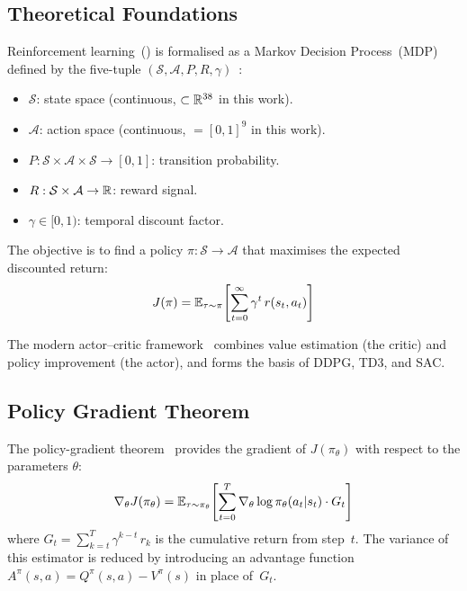\subsection{Theoretical Foundations}
\label{sec:rl_foundations}

Reinforcement learning~(\RL{}) is formalised as a Markov Decision
Process~(MDP) defined by the five-tuple
$(\mathcal{S}, \mathcal{A}, P, R, \gamma)$~\parencite{Bellman1957, Sutton2018}:
\begin{itemize}
  \item $\mathcal{S}$: state space (continuous, $\subset \mathbb{R}^{38}$ in this work).
  \item $\mathcal{A}$: action space (continuous, $= [0,1]^9$ in this work).
  \item $P : \mathcal{S} \times \mathcal{A} \times \mathcal{S} \to [0,1]$:
        transition probability.
  \item $R : \mathcal{S} \times \mathcal{A} \to \mathbb{R}$: reward signal.
  \item $\gamma \in [0,1)$: temporal discount factor.
\end{itemize}

The objective is to find a policy
$\pi : \mathcal{S} \to \mathcal{A}$ that maximises the expected discounted return:
\begin{equation}
  J(\pi) = \mathbb{E}_{\tau \sim \pi}\!\left[\sum_{t=0}^{\infty} \gamma^t\,r(s_t, a_t)\right]
  \label{eq:rl_objective}
\end{equation}

The modern actor--critic framework~\parencite{Konda2000} combines value estimation
(the critic) and policy improvement (the actor), and forms the basis of DDPG, TD3,
and SAC.

\subsection{Policy Gradient Theorem}

The policy-gradient theorem~\parencite{Sutton2018} provides the gradient of
$J(\pi_\theta)$ with respect to the parameters $\theta$:
\begin{equation}
  \nabla_\theta J(\pi_\theta) = \mathbb{E}_{\tau \sim \pi_\theta}\!\left[
    \sum_{t=0}^{T} \nabla_\theta \log \pi_\theta(a_t|s_t) \cdot G_t
  \right]
  \label{eq:pg_theorem}
\end{equation}
where $G_t = \sum_{k=t}^{T} \gamma^{k-t}\,r_k$ is the cumulative return from step~$t$.
The variance of this estimator is reduced by introducing an advantage function
$A^\pi(s,a) = Q^\pi(s,a) - V^\pi(s)$ in place of~$G_t$.


